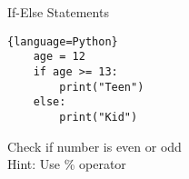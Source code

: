 \begin{frame}[fragile]{If-Else Statements}
    \begin{lstlisting}{language=Python}
    age = 12
    if age >= 13:
        print("Teen")
    else:
        print("Kid")
    \end{lstlisting}
  
    \pause
    Check if number is even or odd \\
    Hint: Use \% operator
  \end{frame}